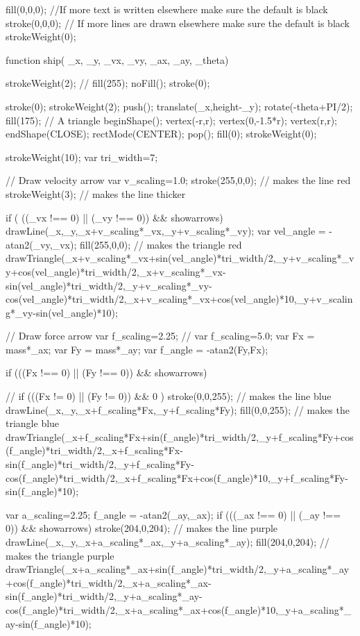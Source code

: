 \documentclass{ximera}
\begin{document}
\begin{javascriptCode}
{      fill(0,0,0); //If more text is written elsewhere make sure the default is black
    stroke(0,0,0); // If more lines are drawn elsewhere make sure the default is black
    strokeWeight(0);

}



function ship( _x,  _y, _vx, _vy, _ax, _ay, _theta)
{
    strokeWeight(2);
    //    fill(255);
    noFill();
    stroke(0);

    stroke(0);
    strokeWeight(2);
    push();
    translate(_x,height-_y);
    rotate(-theta+PI/2);
    fill(175);
    // A triangle
    beginShape();
    vertex(-r,r);
    vertex(0,-1.5*r);
    vertex(r,r);
    endShape(CLOSE);
    rectMode(CENTER);
    pop();
    fill(0);
    strokeWeight(0);
  
  
  
    strokeWeight(10);
    var tri_width=7;

    // Draw velocity arrow
    var v_scaling=1.0;
    stroke(255,0,0); // makes the line red
    strokeWeight(3); // makes the line thicker

    if ( ((_vx !== 0) || (_vy !== 0)) && showarrows) {
        drawLine(_x,_y,_x+v_scaling*_vx,_y+v_scaling*_vy);
        var vel_angle = -atan2(_vy,_vx);
        fill(255,0,0); // makes the triangle red
        drawTriangle(_x+v_scaling*_vx+sin(vel_angle)*tri_width/2,_y+v_scaling*_vy+cos(vel_angle)*tri_width/2,_x+v_scaling*_vx-sin(vel_angle)*tri_width/2,_y+v_scaling*_vy-cos(vel_angle)*tri_width/2,_x+v_scaling*_vx+cos(vel_angle)*10,_y+v_scaling*_vy-sin(vel_angle)*10);
    }

     // Draw force arrow
    var f_scaling=2.25;
//    var f_scaling=5.0;
    var Fx = mass*_ax;
    var Fy = mass*_ay;
    var f_angle = -atan2(Fy,Fx);

    if (((Fx !== 0) || (Fy !== 0)) && showarrows) {
//    if (((Fx != 0) || (Fy != 0)) && 0 ) {
    stroke(0,0,255); // makes the line blue
    drawLine(_x,_y,_x+f_scaling*Fx,_y+f_scaling*Fy);
    fill(0,0,255); // makes the triangle blue
    drawTriangle(_x+f_scaling*Fx+sin(f_angle)*tri_width/2,_y+f_scaling*Fy+cos(f_angle)*tri_width/2,_x+f_scaling*Fx-sin(f_angle)*tri_width/2,_y+f_scaling*Fy-cos(f_angle)*tri_width/2,_x+f_scaling*Fx+cos(f_angle)*10,_y+f_scaling*Fy-sin(f_angle)*10);    
    }
  
    var a_scaling=2.25;
    f_angle = -atan2(_ay,_ax);
    if (((_ax !== 0) || (_ay !== 0)) && showarrows) {
    stroke(204,0,204); // makes the line purple
    drawLine(_x,_y,_x+a_scaling*_ax,_y+a_scaling*_ay);
    fill(204,0,204); // makes the triangle purple
    drawTriangle(_x+a_scaling*_ax+sin(f_angle)*tri_width/2,_y+a_scaling*_ay+cos(f_angle)*tri_width/2,_x+a_scaling*_ax-sin(f_angle)*tri_width/2,_y+a_scaling*_ay-cos(f_angle)*tri_width/2,_x+a_scaling*_ax+cos(f_angle)*10,_y+a_scaling*_ay-sin(f_angle)*10);
    }
  

}}
\end{javascriptCode}
\end{document}
